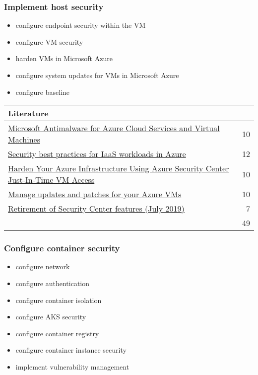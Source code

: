 \subsubsection{Implement host security}
\begin{itemize}
\item configure endpoint security within the VM 
\item configure VM security 
\item harden VMs in Microsoft Azure 
\item configure system updates for VMs in Microsoft Azure 
\item configure baseline 
\end{itemize}

\begin{tabular}{p{14cm} | r}
\textbf{Literature} & \\
\hline
\href{https://docs.microsoft.com/en-us/azure/security/fundamentals/antimalware}{Microsoft Antimalware for Azure Cloud Services and Virtual Machines} & 10 \\
\href{https://docs.microsoft.com/en-us/azure/security/fundamentals/iaas}{Security best practices for IaaS workloads in Azure} & 12 \\
\href{https://blogs.msdn.microsoft.com/mvpawardprogram/2018/01/09/just-in-time-access-azure-vms/}{Harden Your Azure Infrastructure Using Azure Security Center Just-In-Time VM Access} & 10 \\
\href{https://docs.microsoft.com/en-us/azure/automation/automation-tutorial-update-management}{Manage updates and patches for your Azure VMs} & 10 \\
\href{https://docs.microsoft.com/en-us/azure/security-center/security-center-features-retirement-july2019#menu_securityconfigurations}{Retirement of Security Center features (July 2019)} & 7 \\
\cline{2-2} 
 & 49 \\
\end{tabular}

\subsubsection{Configure container security}
\begin{itemize}
\item configure network 
\item configure authentication 
\item configure container isolation 
\item configure AKS security 
\item configure container registry 
\item configure container instance security 
\item implement vulnerability management 
\end{itemize}

